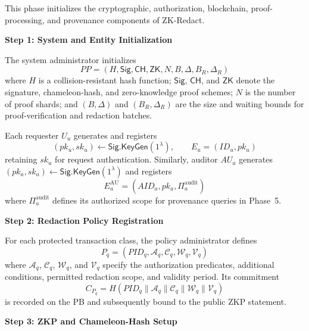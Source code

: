 \documentclass[lettersize,journal]{IEEEtran}
\begin{document}
This phase initializes the cryptographic, authorization, blockchain,
proof-processing, and provenance components of ZK-Redact.

\smallskip
\noindent\textbf{Step 1: System and Entity Initialization}

The system administrator initializes
\begin{equation}
PP=(H,\mathsf{Sig},\mathsf{CH},\mathsf{ZK},
N,B,\Delta,B_R,\Delta_R)
\label{eq:pp}
\end{equation}
where $H$ is a collision-resistant hash function; $\mathsf{Sig}$,
$\mathsf{CH}$, and $\mathsf{ZK}$ denote the signature, chameleon-hash,
and zero-knowledge proof schemes; $N$ is the number of proof shards;
and $(B,\Delta)$ and $(B_R,\Delta_R)$ are the size and waiting bounds
for proof-verification and redaction batches.

Each requester $U_u$ generates and registers
\begin{equation}
(pk_u,sk_u)\leftarrow\mathsf{Sig.KeyGen}(1^\lambda),
\qquad
E_u=(ID_u,pk_u)
\label{eq:user-keygen}
\end{equation}
retaining $sk_u$ for request authentication. Similarly, auditor $AU_a$
generates $(pk_a,sk_a)\leftarrow\mathsf{Sig.KeyGen}(1^\lambda)$ and
registers
\begin{equation}
E_a^{\mathrm{AU}}
=
(AID_a,pk_a,\Pi_a^{\mathrm{audit}})
\label{eq:auditor-registration}
\end{equation}
where $\Pi_a^{\mathrm{audit}}$ defines its authorized scope for
provenance queries in Phase~5.

\smallskip
\noindent\textbf{Step 2: Redaction Policy Registration}

For each protected transaction class, the policy administrator defines
\begin{equation}
P_q=
(PID_q,\mathcal{A}_q,\mathcal{C}_q,
\mathcal{W}_q,\mathcal{V}_q)
\label{eq:redaction-policy}
\end{equation}
where $\mathcal{A}_q$, $\mathcal{C}_q$, $\mathcal{W}_q$, and
$\mathcal{V}_q$ specify the authorization predicates, additional
conditions, permitted redaction scope, and validity period. Its
commitment
\begin{equation}
C_{P_q}
=
H\!\left(
PID_q\parallel\mathcal{A}_q\parallel\mathcal{C}_q
\parallel\mathcal{W}_q\parallel\mathcal{V}_q
\right)
\label{eq:policy-commitment}
\end{equation}
is recorded on the PB and subsequently bound to the public ZKP
statement.

\smallskip
\noindent\textbf{Step 3: ZKP and Chameleon-Hash Setup}
\end{document}
